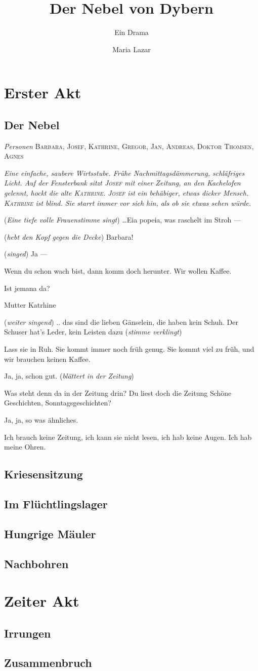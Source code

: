 \documentclass[
	final,
	a4paper,
	ngerman,
	mpinclude = true, %
	twoside = true,
	open = right,
	cleardoublepage = plain,
	DIV = 13,
	BCOR = 1cm,
	titlepage = firstiscover,
	]{scrbook}
\title{Der Nebel von Dybern}
\subtitle{Ein Drama}
\author{Maria Lazar}
\date{\ifdirectorsversion{-- Regie-Version --}{}}
\newcommand{\act}{\chapter}
\newcommand{\scene}{\setcounter{subscene}{1}\section}
\newcommand{\direction}[1]{(\textit{#1})}
\newcommand{\setting}[1]{\vspace{-0.5\baselineskip}\centering\textit{#1}}
\newcounter{subscene}
\newcommand{\characterlist}[1]{{\begin{center}\textit{Personen} #1\end{center}}}
\newcommand{\thecharacter}[1]{\textup{\textsc{#1}}\xspace}
\newcommand{\theBarbara}{\thecharacter{Barbara}}
\newcommand{\theJosef}{\thecharacter{Josef}}
\newcommand{\theKathrine}{\thecharacter{Kathrine}}
\newcommand{\theGregor}{\thecharacter{Gregor}}
\newcommand{\theJan}{\thecharacter{Jan}}
\newcommand{\theAndreas}{\thecharacter{Andreas}}
\newcommand{\theAgnes}{\thecharacter{Agnes}}
\newcommand{\theThomsen}{\thecharacter{Doktor Thomsen}}
\newcommand{\character}[1]{\item[#1]}
\newcommand{\Barbara}{\character{\theBarbara}}
\newcommand{\Josef}{\character{\theJosef}}
\newcommand{\Kathrine}{\character{\theKathrine}}
\begin{document}
%
\cleardoubleoddemptypage

\maketitle

\tableofcontents
\cleardoubleoddpage

\pagestyle{headings}
\doublespacing

\act{Erster Akt}
\scene{Der Nebel}
\characterlist{\theBarbara, \theJosef, \theKathrine, \theGregor, \theJan, \theAndreas, \theThomsen, \theAgnes}
\setting{Eine einfache, saubere Wirtsstube. Frühe Nachmittagsdämmerung, schläfriges Licht. Auf der Fensterbank sitzt \theJosef mit einer Zeitung, an den Kachelofen gelennt, hockt die alte \theKathrine. \theJosef ist ein behäbiger, etwas dicker Mensch. \theKathrine ist blind. Sie starrt immer vor sich hin, als ob sie etwas sehen würde.}

\begin{play}

\Barbara
\direction{Eine tiefe volle Frauenstimme singt} \ldots Eia popeia, was raschelt im Stroh ---

\Josef
\direction{hebt den Kopf gegen die Decke} Barbara!

\Barbara
\direction{singed} Ja ---

\Josef
Wenn du schon wach bist, dann komm doch herunter. Wir wollen Kaffee.

\Barbara
Ist jemana da?

\Josef
Mutter Katrhine

\Barbara
\direction{weiter singend}
.. das sind die lieben Gänselein, die haben kein Schuh.
Der Schuser hat's Leder, kein Leisten dazu
\direction{stimme verklingt}

\Kathrine
Lass sie in Ruh. Sie kommt immer noch früh genug. Sie kommt viel zu früh, und wir brauchen keinen Kaffee.

\Josef
Ja, ja, schon gut. \direction{blättert in der Zeitung}

\Kathrine
Was steht denn da in der Zeitung drin? Du liest doch die Zeitung Schöne Geschichten, Sonntagsgeschichten?

\Josef
Ja, ja, so was ähnliches.

\Kathrine
Ich brauch keine Zeitung, ich kann sie nicht lesen, ich hab keine Augen. Ich hab meine Ohren.

\end{play}

\scene{Kriesensitzung}
\scene{Im Flüchtlingslager}
\scene{Hungrige Mäuler}
\scene{Nachbohren}

\act{Zeiter Akt}
\scene{Irrungen}
\scene{Zusammenbruch}
\end{document}
